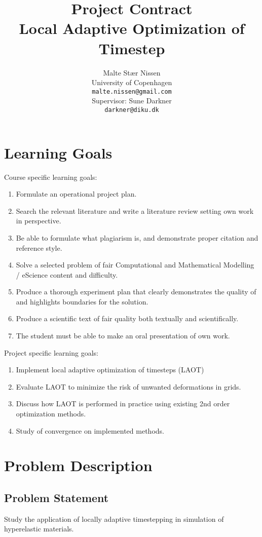 \documentclass[11pt,a4paper]{article}
\title{Project Contract\\Local Adaptive Optimization of Timestep}
\author{Malte Stær Nissen\\University of Copenhagen\\\texttt{malte.nissen@gmail.com}\\Supervisor: Sune Darkner\\\texttt{darkner@diku.dk}}
\begin{document}
\maketitle

\section{Learning Goals}
Course specific learning goals:
\begin{enumerate}
	\item Formulate an operational project plan.
	\item Search the relevant literature and write a literature review setting own work in perspective.
	\item Be able to formulate what plagiarism is, and demonstrate proper citation and reference style.
	\item Solve a selected problem of fair Computational and Mathematical Modelling / eScience content and difficulty.
	\item Produce a thorough experiment plan that clearly demonstrates the quality of and highlights boundaries for the solution. 
	\item Produce a scientific text of fair quality both textually and scientifically.
	\item The student must be able to make an oral presentation of own work.
\end{enumerate}
Project specific learning goals:
\begin{enumerate}
    \item Implement local adaptive optimization of timesteps (LAOT)
	\item Evaluate LAOT to minimize the risk of unwanted deformations in grids.
    \item Discuss how LAOT is performed in practice using existing 2nd order optimization methods.
    \item Study of convergence on implemented methods.
\end{enumerate}

\section{Problem Description}

\subsection{Problem Statement}
Study the application of locally adaptive timestepping in simulation of hyperelastic materials.
\end{document}
